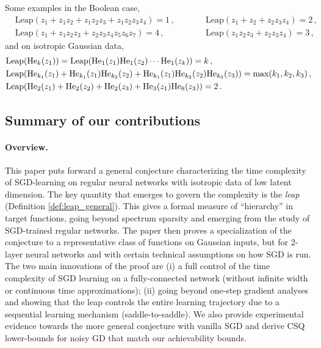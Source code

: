 \documentclass[11pt]{article}
\newcommand{\<}{\langle}
\renewcommand{\>}{\rangle}
\theoremstyle{definition}
\def\He{{\rm He}}
\def\He{{\rm He}}
\def\Leap{\mathrm{Leap}}
\begin{document}
Some examples in the Boolean case,
\[
\begin{aligned}
&\mathrm{Leap} ( z_1 + z_1z_2 + z_1z_2z_3 + z_1z_2z_3z_4 ) = 1\, , \qquad  && \mathrm{Leap} ( z_1 + z_2 + z_2z_3 z_4 ) = 2\, ,  \\
&\mathrm{Leap} ( z_1 + z_1z_2z_3 + z_2z_3 z_4 z_5z_6z_7) = 4\, , \qquad &&\mathrm{Leap} ( z_1 z_2 z_3 + z_2 z_3 z_4) = 3\, ,
\end{aligned}
\]
and on isotropic Gaussian data,
\[
\begin{aligned}
&\mathrm{Leap} ( \He_k (z_1) ) = \Leap(\He_1(z_1) \He_1 (z_2) \cdots \He_1(z_k)) = k \, ,  \\
&\mathrm{Leap} ( \He_{k_1} (z_1) + \He_{k_1} (z_1) \He_{k_2} (z_2) + \He_{k_1} (z_1) \He_{k_2} (z_2)\He_{k_3} (z_3) ) = \max(k_1 , k_2, k_3) \, ,  \\
&\mathrm{Leap} ( \He_2 (z_1) + \He_2 (z_2 ) + \He_2 (z_3) + \He_3(z_1)\He_8(z_3) ) = 2\, .
\end{aligned}
\]




\subsection{Summary of our contributions}
\label{sec:summary}





 \paragraph{Overview.} This paper puts forward a general conjecture characterizing the time complexity of SGD-learning on regular neural networks with isotropic data of low latent dimension. The key quantity that emerges to govern the complexity is the \textit{leap} (Definition \ref{def:leap_general}). 
This gives a formal measure of ``hierarchy'' in target functions, going beyond spectrum sparsity and emerging from the study of SGD-trained regular networks. The paper then proves a specialization of the conjecture to a representative class of functions on Gaussian inputs, but  for 2-layer neural networks and with certain technical assumptions on how SGD is run. The two main innovations of the proof are (i) a full control of the time complexity of SGD learning on a fully-connected network (without infinite width or continuous time approximations); (ii) going beyond one-step gradient analyses and showing that the leap controls the entire learning trajectory due to a sequential learning mechanism (saddle-to-saddle). We also provide experimental evidence towards the more general conjecture with vanilla SGD and derive CSQ lower-bounds for noisy GD that match our achievability bounds. 
\end{document}
